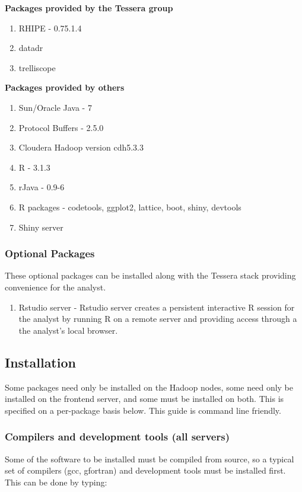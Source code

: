\textbf{Packages provided by the Tessera group}
\begin{enumerate}
\item RHIPE - 0.75.1.4
\item datadr
\item trelliscope
\end{enumerate}
\textbf{Packages provided by others}
\begin{enumerate}
\item Sun/Oracle Java - 7
\item Protocol Buffers - 2.5.0 
\item Cloudera Hadoop version cdh5.3.3
\item R - 3.1.3
\item rJava - 0.9-6 
\item R packages - codetools, ggplot2, lattice, boot, shiny, devtools
\item Shiny server
\end{enumerate}

\subsubsection{Optional Packages}
These optional packages can be installed along with the Tessera stack providing convenience for the analyst. 
\begin{enumerate}
\item Rstudio server - Rstudio server creates a persistent interactive R session for the analyst by running R on a remote server and providing access through a the analyst's local browser.
\end{enumerate}

\newpage

\subsection{Installation}
Some packages need only be installed on the Hadoop nodes, some need only
be installed on the frontend server, and some must be installed on both.
This is specified on a per-package basis below. This guide is command
line friendly.

\subsubsection{Compilers and development tools (all servers)}
Some of the software to be installed must be compiled from source, so a
typical set of compilers (gcc, gfortran) and development tools must
be installed first.  This can be done by typing:

